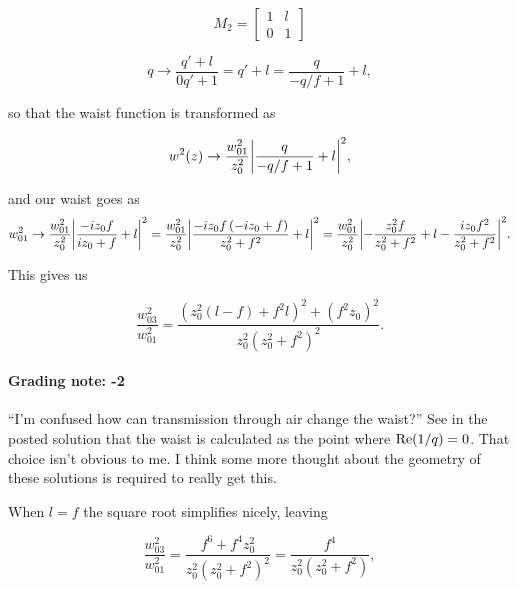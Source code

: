 {\begin{dmath}\label{eqn:problemSet4Problem1:160}
M_2 =
\begin{bmatrix}
1 & l \\
0 & 1
\end{bmatrix}
\end{dmath}

\begin{dmath}\label{eqn:problemSet4Problem1:180}
q
\rightarrow \frac{q' + l}{0 q' + 1}
= q' + l
= \frac{q}{-q/f + 1} + l,
\end{dmath}

so that the waist function is transformed as

\begin{dmath}\label{eqn:problemSet4Problem1:200}
w^2(z) \rightarrow \frac{w_{01}^2}{z_0^2} \Abs{
\frac{q}{-q/f + 1} + l
}^2,
\end{dmath}

and our waist goes as
\begin{dmath}\label{eqn:problemSet4Problem1:220}
w_{01}^2
\rightarrow \frac{w_{01}^2}{z_0^2} \Abs{
\frac{-i z_0 f }{i z_0 + f} + l
}^2
= \frac{w_{01}^2}{z_0^2} \Abs{
\frac{-i z_0 f \left(-i z_0 + f\right)}{z_0^2 + f^2} + l
}^2
= \frac{w_{01}^2}{z_0^2} \Abs{
-\frac{z_0^2 f}{z_0^2 + f^2} + l
-\frac{i z_0 f^2 }{z_0^2 + f^2}
}^2.
\end{dmath}

This gives us

\begin{dmath}\label{eqn:problemSet4Problem1:240}
\boxed{
\frac{w_{03}^2}{w_{01}^2}
= \frac{
\left(z_0^2 \left(l - f\right) + f^2 l\right)^2
+ \left( f^2 z_0  \right)^2
}{z_0^2 \left(z_0^2 + f^2\right)^2 }.
}
\end{dmath}

\paragraph{Grading note: -2} ``I'm confused how can transmission through air change the waist?''  See in the posted solution that the waist is calculated as the point where $\operatorname{Re}(1/q) = 0$.  That choice isn't obvious to me.  I think some more thought about the geometry of these solutions is required to really get this.

When $l = f$ the square root simplifies nicely, leaving

\begin{dmath}\label{eqn:problemSet4Problem1:260}
\frac{w_{03}^2}{w_{01}^2}
= \frac{
f^6 + f^4 z_0^2
}{z_0^2 \left(z_0^2 + f^2\right)^2 }
=
\frac{f^4}{z_0^2\left(z_0^2 + f^2\right) },
\end{dmath}

}
